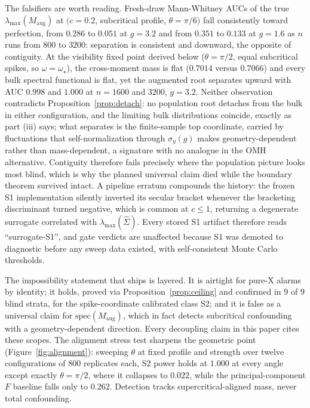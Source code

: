 The falsifiers are worth reading. Fresh-draw Mann-Whitney AUCs of the true $\lambda_{\max}(M_{\mathrm{aug}})$ at $(c=0.2$, subcritical profile, $\theta=\pi/6)$ fall consistently toward perfection, from $0.286$ to $0.051$ at $g=3.2$ and from $0.351$ to $0.133$ at $g=1.6$ as $n$ runs from $800$ to $3200$: separation is consistent and downward, the opposite of contiguity. At the visibility fixed point derived below ($\theta=\pi/2$, equal subcritical spikes, so $\omega=\omega_\star$), the cross-moment mass is flat ($0.7014$ versus $0.7066$) and every bulk spectral functional is flat, yet the augmented root separates upward with AUC $0.998$ and $1.000$ at $n=1600$ and $3200$, $g=3.2$. Neither observation contradicts Proposition~\ref{prop:detach}: no population root detaches from the bulk in either configuration, and the limiting bulk distributions coincide, exactly as part (iii) says; what separates is the finite-sample top coordinate, carried by fluctuations that self-normalization through $\sigma_y(g)$ makes geometry-dependent rather than mass-dependent, a signature with no analogue in the OMH alternative. Contiguity therefore fails precisely where the population picture looks most blind, which is why the planned universal claim died while the boundary theorem survived intact. A pipeline erratum compounds the history: the frozen S1 implementation silently inverted its secular bracket whenever the bracketing discriminant turned negative, which is common at $c\le 1$, returning a degenerate surrogate correlated with $\lambda_{\max}(\hat\Sigma)$. Every stored S1 artifact therefore reads ``surrogate-S1'', and gate verdicts are unaffected because S1 was demoted to diagnostic before any sweep data existed, with self-consistent Monte Carlo thresholds.

The impossibility statement that ships is layered. It is airtight for pure-X alarms by identity; it holds, proved via Proposition~\ref{prop:ceiling} and confirmed in $9$ of $9$ blind strata, for the spike-coordinate calibrated class S2; and it is false as a universal claim for $\mathrm{spec}(M_{\mathrm{aug}})$, which in fact detects subcritical confounding with a geometry-dependent direction. Every decoupling claim in this paper cites these scopes. The alignment stress test sharpens the geometric point (Figure~\ref{fig:alignment}): sweeping $\theta$ at fixed profile and strength over twelve configurations of $800$ replicates each, S2 power holds at $1.000$ at every angle except exactly $\theta=\pi/2$, where it collapses to $0.022$, while the principal-component $F$ baseline falls only to $0.262$. Detection tracks supercritical-aligned mass, never total confounding.

